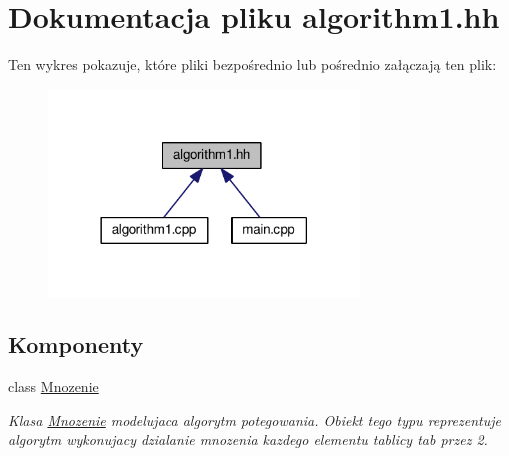 \hypertarget{algorithm1_8hh}{\section{Dokumentacja pliku algorithm1.\-hh}
\label{algorithm1_8hh}
}
Ten wykres pokazuje, które pliki bezpośrednio lub pośrednio załączają ten plik\-:\nopagebreak
\begin{figure}[H]
\begin{center}
\leavevmode
\includegraphics[width=234pt]{algorithm1_8hh__dep__incl}
\end{center}
\end{figure}
\subsection*{Komponenty}
\begin{DoxyCompactItemize}
\item 
class \hyperlink{class_mnozenie}{Mnozenie}
\begin{DoxyCompactList}\small\item\em Klasa \hyperlink{class_mnozenie}{Mnozenie} modelujaca algorytm potegowania. Obiekt tego typu reprezentuje algorytm wykonujacy dzialanie mnozenia kazdego elementu tablicy tab przez 2. \end{DoxyCompactList}\end{DoxyCompactItemize}
